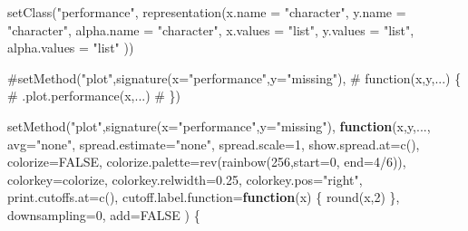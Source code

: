 \documentclass[
  letterpaper,
  DIV=11,
  numbers=noendperiod]{scrartcl}
\newenvironment{Shaded}{\begin{snugshade}}{\end{snugshade}}
\newcommand{\AttributeTok}[1]{\textcolor[rgb]{0.40,0.45,0.13}{#1}}
\newcommand{\CommentTok}[1]{\textcolor[rgb]{0.37,0.37,0.37}{#1}}
\newcommand{\ConstantTok}[1]{\textcolor[rgb]{0.56,0.35,0.01}{#1}}
\newcommand{\ControlFlowTok}[1]{\textcolor[rgb]{0.00,0.23,0.31}{\textbf{#1}}}
\newcommand{\DecValTok}[1]{\textcolor[rgb]{0.68,0.00,0.00}{#1}}
\newcommand{\FloatTok}[1]{\textcolor[rgb]{0.68,0.00,0.00}{#1}}
\newcommand{\FunctionTok}[1]{\textcolor[rgb]{0.28,0.35,0.67}{#1}}
\newcommand{\NormalTok}[1]{\textcolor[rgb]{0.00,0.23,0.31}{#1}}
\newcommand{\SpecialCharTok}[1]{\textcolor[rgb]{0.37,0.37,0.37}{#1}}
\newcommand{\StringTok}[1]{\textcolor[rgb]{0.13,0.47,0.30}{#1}}
\begin{document}
\begin{Shaded}
\begin{Highlighting}[]
\FunctionTok{setClass}\NormalTok{(}\StringTok{"performance"}\NormalTok{,}
         \FunctionTok{representation}\NormalTok{(}\AttributeTok{x.name       =} \StringTok{"character"}\NormalTok{,}
                        \AttributeTok{y.name       =} \StringTok{"character"}\NormalTok{,}
                        \AttributeTok{alpha.name   =} \StringTok{"character"}\NormalTok{,}
                        \AttributeTok{x.values     =} \StringTok{"list"}\NormalTok{,}
                        \AttributeTok{y.values     =} \StringTok{"list"}\NormalTok{,}
                        \AttributeTok{alpha.values =} \StringTok{"list"}\NormalTok{ ))}

\CommentTok{\#setMethod("plot",signature(x="performance",y="missing"),}
\CommentTok{\#          function(x,y,...) \{}
\CommentTok{\#              .plot.performance(x,...)}
\CommentTok{\#          \})}

\FunctionTok{setMethod}\NormalTok{(}\StringTok{"plot"}\NormalTok{,}\FunctionTok{signature}\NormalTok{(}\AttributeTok{x=}\StringTok{"performance"}\NormalTok{,}\AttributeTok{y=}\StringTok{"missing"}\NormalTok{),}
          \ControlFlowTok{function}\NormalTok{(x,y,..., }\AttributeTok{avg=}\StringTok{"none"}\NormalTok{, }\AttributeTok{spread.estimate=}\StringTok{"none"}\NormalTok{,}
  \AttributeTok{spread.scale=}\DecValTok{1}\NormalTok{, }\AttributeTok{show.spread.at=}\FunctionTok{c}\NormalTok{(), }\AttributeTok{colorize=}\ConstantTok{FALSE}\NormalTok{,}
  \AttributeTok{colorize.palette=}\FunctionTok{rev}\NormalTok{(}\FunctionTok{rainbow}\NormalTok{(}\DecValTok{256}\NormalTok{,}\AttributeTok{start=}\DecValTok{0}\NormalTok{, }\AttributeTok{end=}\DecValTok{4}\SpecialCharTok{/}\DecValTok{6}\NormalTok{)),}
  \AttributeTok{colorkey=}\NormalTok{colorize, }\AttributeTok{colorkey.relwidth=}\FloatTok{0.25}\NormalTok{, }\AttributeTok{colorkey.pos=}\StringTok{"right"}\NormalTok{,}
  \AttributeTok{print.cutoffs.at=}\FunctionTok{c}\NormalTok{(), }\AttributeTok{cutoff.label.function=}\ControlFlowTok{function}\NormalTok{(x) \{ }\FunctionTok{round}\NormalTok{(x,}\DecValTok{2}\NormalTok{) \},}
  \AttributeTok{downsampling=}\DecValTok{0}\NormalTok{, }\AttributeTok{add=}\ConstantTok{FALSE}\NormalTok{ ) \{}


\end{Highlighting}
\end{Shaded}
\end{document}
